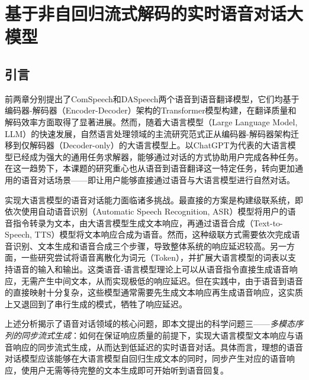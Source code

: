 \chapter{基于非自回归流式解码的实时语音对话大模型}\label{chap:llama-omni}

\section{引言}

前两章分别提出了ComSpeech和DASpeech两个语音到语音翻译模型，它们均基于编码器-解码器（Encoder-Decoder）架构的Transformer模型构建，在翻译质量和解码效率方面取得了显著进展。然而，随着大语言模型（Large Language Model, LLM）的快速发展，自然语言处理领域的主流研究范式正从编码器-解码器架构迁移到仅解码器（Decoder-only）的大语言模型上。以ChatGPT\citep{chatgpt}为代表的大语言模型已经成为强大的通用任务求解器，能够通过对话的方式协助用户完成各种任务。在这一趋势下，本课题的研究重心也从语音到语音翻译这一特定任务，转向更加通用的语音对话场景——即让用户能够直接通过语音与大语言模型进行自然对话。

实现大语言模型的语音对话能力面临诸多挑战。最直接的方案是构建级联系统，即依次使用自动语音识别（Automatic Speech Recognition, ASR）模型将用户的语音指令转录为文本，由大语言模型生成文本响应，再通过语音合成（Text-to-Speech, TTS）模型将文本响应合成为语音。然而，这种级联方式需要依次完成语音识别、文本生成和语音合成三个步骤，导致整体系统的响应延迟较高。另一方面，一些研究尝试将语音离散化为词元（Token），并扩展大语言模型的词表以支持语音的输入和输出\citep{zhang-etal-2023-speechgpt, rubenstein2023audiopalm}。这类语音-语言模型理论上可以从语音指令直接生成语音响应，无需产生中间文本，从而实现极低的响应延迟。但在实践中，由于语音到语音的直接映射十分复杂，这些模型通常需要先生成文本响应再生成语音响应\citep{zhang-etal-2023-speechgpt}，这实质上又退回到了串行生成的模式，牺牲了响应延迟。

上述分析揭示了语音对话领域的核心问题，即本文提出的科学问题三——\textit{多模态序列的同步流式生成}：如何在保证响应质量的前提下，实现大语言模型文本响应与语音响应的同步流式生成，从而达到低延迟的实时语音对话。具体而言，理想的语音对话模型应该能够在大语言模型自回归生成文本的同时，同步产生对应的语音响应，使用户无需等待完整的文本生成即可开始听到语音回复。


